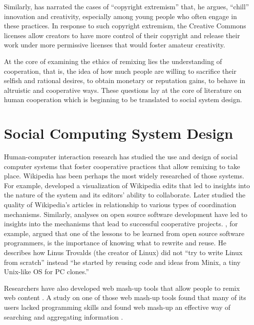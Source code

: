 Similarly, \citet{lessig_remix:_2008} has narrated the cases of ``copyright extremism'' that, he argues, ``chill''
 innovation and creativity, especially among young people who often engage in these practices.
In response to such copyright extremism, the Creative Commons licenses allow creators to have more control of their copyright and release their work under more permissive licenses that would foster amateur creativity.

At the core of examining the ethics of remixing lies the understanding of cooperation, that is, the idea of how much people are willing to sacrifice their selfish and rational desires, to obtain monetary or reputation gains, to behave in altruistic and cooperative ways. 
These questions lay at the core of literature on human cooperation which is beginning to be translated to social system design.

\section{Social Computing System Design}

Human-computer interaction research has studied the use and design of social computer systems that foster cooperative practices that allow remixing to take place.
Wikipedia has been perhaps the most widely researched of those systems. 
For example, \citet{viegas_studying_2004} developed a visualization of Wikipedia edits that led to insights into the nature of the system and its editors' ability to collaborate. 
Later \citet{kittur_harnessing_2008} studied the quality of Wikipedia's articles in relationship to various types of coordination mechanisms.
Similarly, analyses on open source software development have led to insights into the mechanisms that lead to successful cooperative projects. 
\citet{raymond_cathedral_1999}, for example, argued that one of the lessons to be learned from open source software programmers, is the importance of knowing what to rewrite and reuse. 
He describes how Linus Trovalds (the creator of Linux) did not ``try to write Linux from scratch'' instead ``he started by reusing code and ideas from Minix, a tiny Unix-like OS for PC clones.'' 

Researchers have also developed web mash-up tools that allow people to remix web content \citep{bolin_automation_2005,wong_making_2007}.
A study on one of those web mash-up tools found that many of its users lacked programming skills and found web mash-up an effective way of searching and aggregating information \citet{nan_zang_whats_2008}.


